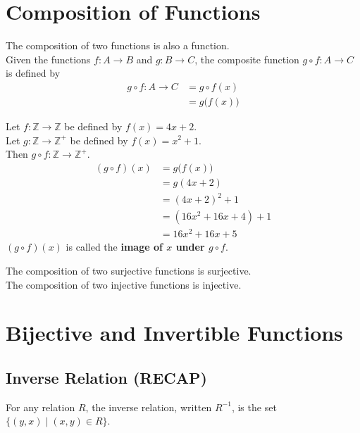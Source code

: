 \documentclass[../notes.tex]{subfiles}
\begin{document}
		\section{Composition of Functions}
			The composition of two functions is also a function.\\
			Given the functions $f: A \rightarrow B$ and $g: B \rightarrow C$, the composite function $g \circ f: A \rightarrow C$ is defined by
			\begin{align*}
				g \circ f: A \rightarrow C &= g \circ f(x)\\
				&= g\bigl(f(x)\bigr)
			\end{align*}
			\begin{examplebox}
				Let $f: \mathbb{Z} \rightarrow \mathbb{Z}$ be defined by $f(x) = 4x + 2$.\\
				Let $g: \mathbb{Z} \rightarrow \mathbb{Z}^{+}$ be defined by $f(x) = x^{2} + 1$.\\
				Then $g \circ f: \mathbb{Z} \rightarrow \mathbb{Z}^{+}$.
				\begin{align*}
					(g \circ f)(x) &= g\bigl(f(x)\bigr)\\
					&= g(4x + 2)\\
					&= (4x + 2)^{2} + 1\\
					&= \left(16x^{2} + 16x + 4\right) + 1\\
					&= 16x^{2} + 16x + 5
				\end{align*}
				$(g \circ f)(x)$ is called the \textbf{image of $x$ under $g \circ f$}.
			\end{examplebox}
			The composition of two surjective functions is surjective.\\
			The composition of two injective functions is injective.
		\section{Bijective and Invertible Functions}
			\subsection[Inverse Relation]{Inverse Relation (RECAP)}
				For any relation $R$, the inverse relation, written $R^{-1}$, is the set $\bigl\{(y, x) \mid (x, y) \in R\bigr\}$.
\end{document}
